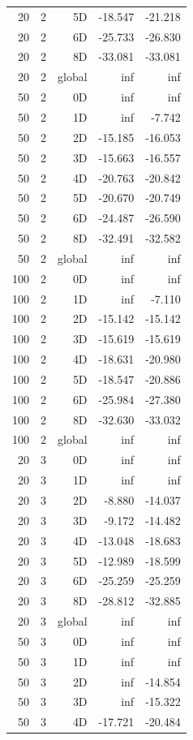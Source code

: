 \begin{longtable}{rrrrr}
20 & 2 & 5D & -18.547 & -21.218 \\
20 & 2 & 6D & -25.733 & -26.830 \\
20 & 2 & 8D & -33.081 & -33.081 \\
20 & 2 & global & inf & inf \\
50 & 2 & 0D & inf & inf \\
50 & 2 & 1D & inf & -7.742 \\
50 & 2 & 2D & -15.185 & -16.053 \\
50 & 2 & 3D & -15.663 & -16.557 \\
50 & 2 & 4D & -20.763 & -20.842 \\
50 & 2 & 5D & -20.670 & -20.749 \\
50 & 2 & 6D & -24.487 & -26.590 \\
50 & 2 & 8D & -32.491 & -32.582 \\
50 & 2 & global & inf & inf \\
100 & 2 & 0D & inf & inf \\
100 & 2 & 1D & inf & -7.110 \\
100 & 2 & 2D & -15.142 & -15.142 \\
100 & 2 & 3D & -15.619 & -15.619 \\
100 & 2 & 4D & -18.631 & -20.980 \\
100 & 2 & 5D & -18.547 & -20.886 \\
100 & 2 & 6D & -25.984 & -27.380 \\
100 & 2 & 8D & -32.630 & -33.032 \\
100 & 2 & global & inf & inf \\
20 & 3 & 0D & inf & inf \\
20 & 3 & 1D & inf & inf \\
20 & 3 & 2D & -8.880 & -14.037 \\
20 & 3 & 3D & -9.172 & -14.482 \\
20 & 3 & 4D & -13.048 & -18.683 \\
20 & 3 & 5D & -12.989 & -18.599 \\
20 & 3 & 6D & -25.259 & -25.259 \\
20 & 3 & 8D & -28.812 & -32.885 \\
20 & 3 & global & inf & inf \\
50 & 3 & 0D & inf & inf \\
50 & 3 & 1D & inf & inf \\
50 & 3 & 2D & inf & -14.854 \\
50 & 3 & 3D & inf & -15.322 \\
50 & 3 & 4D & -17.721 & -20.484 \\

\end{longtable}
